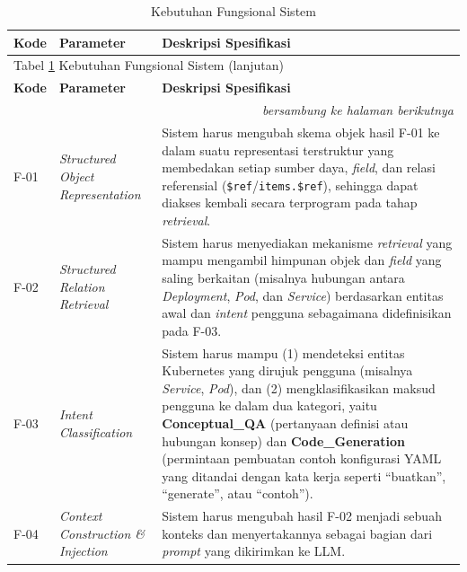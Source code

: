 \captionsetup[longtable]{justification=raggedright,singlelinecheck=false}

\begin{longtable}{ | p{} | p{} | p{} |}
\caption{Kebutuhan Fungsional Sistem}
\label{tbl:fungsional} \\
\hline
\textbf{Kode} & \textbf{Parameter} & \textbf{Deskripsi Spesifikasi} \\ 
\hline
\endfirsthead

\multicolumn{3}{l}{Tabel \ref{tbl:fungsional} Kebutuhan Fungsional Sistem (lanjutan)} \\
\hline
\textbf{Kode} & \textbf{Parameter} & \textbf{Deskripsi Spesifikasi} \\ 
\hline
\endhead


\hline
\multicolumn{3}{r}{\textit{bersambung ke halaman berikutnya}} \\
\endfoot

\hline
\endlastfoot

F-01 & \textit{Structured Object Representation} & Sistem harus mengubah skema objek hasil F-01 ke dalam suatu representasi terstruktur yang membedakan setiap sumber daya, \textit{field}, dan relasi referensial (\texttt{\$ref}/\texttt{items.\$ref}), sehingga dapat diakses kembali secara terprogram pada tahap \textit{retrieval}. \\
\hline

F-02 & \textit{Structured Relation Retrieval} & Sistem harus menyediakan mekanisme \textit{retrieval} yang mampu mengambil himpunan objek dan \textit{field} yang saling berkaitan (misalnya hubungan antara \textit{Deployment}, \textit{Pod}, dan \textit{Service}) berdasarkan entitas awal dan \textit{intent} pengguna sebagaimana didefinisikan pada F-03. \\
\hline

F-03 & \textit{Intent Classification} & Sistem harus mampu (1) mendeteksi entitas Kubernetes yang dirujuk pengguna (misalnya \textit{Service}, \textit{Pod}), dan (2) mengklasifikasikan maksud pengguna ke dalam dua kategori, yaitu \textbf{Conceptual\_QA} (pertanyaan definisi atau hubungan konsep) dan \textbf{Code\_Generation} (permintaan pembuatan contoh konfigurasi YAML yang ditandai dengan kata kerja seperti ``buatkan'', ``generate'', atau ``contoh''). \\
\hline

F-04 & \textit{Context Construction \& Injection} & Sistem harus mengubah hasil F-02 menjadi sebuah konteks dan menyertakannya sebagai bagian dari \textit{prompt} yang dikirimkan ke LLM. \\
\hline


\end{longtable}
